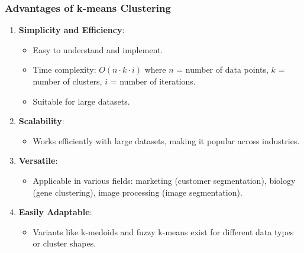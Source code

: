 \documentclass[aspectratio=169]{beamer}
\begin{document}
\begin{frame}[fragile]
  \frametitle{Advantages of k-means Clustering}
  \begin{enumerate}
    \item \textbf{Simplicity and Efficiency}:
      \begin{itemize}
        \item Easy to understand and implement.
        \item Time complexity: \(O(n \cdot k \cdot i)\) where \(n\) = number of data points, \(k\) = number of clusters, \(i\) = number of iterations.
        \item Suitable for large datasets.
      \end{itemize}

    \item \textbf{Scalability}:
      \begin{itemize}
        \item Works efficiently with large datasets, making it popular across industries.
      \end{itemize}

    \item \textbf{Versatile}:
      \begin{itemize}
        \item Applicable in various fields: marketing (customer segmentation), biology (gene clustering), image processing (image segmentation).
      \end{itemize}

    \item \textbf{Easily Adaptable}:
      \begin{itemize}
        \item Variants like k-medoids and fuzzy k-means exist for different data types or cluster shapes.
      \end{itemize}
  \end{enumerate}
\end{frame}
\end{document}
